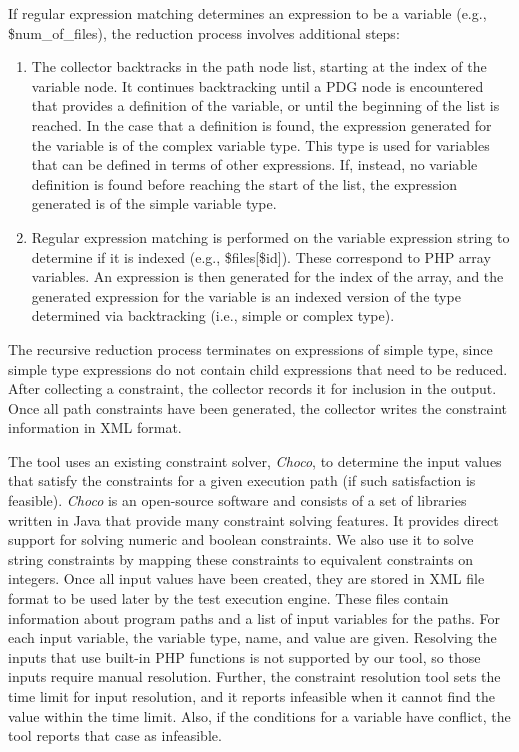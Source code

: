 If regular expression matching determines an expression
to be a variable (e.g., \$num\_of\_files), the reduction
process involves additional steps:

\begin{enumerate}
  \item The collector backtracks in the path node list,
starting at the index of the variable node. It continues
backtracking until a PDG node is encountered that provides
a definition of the variable, or until the beginning of
the list is reached. In the case that a definition is found,
the expression generated for the variable is of the complex
variable type. This type is used for variables that can be
defined in terms of other expressions. If, instead, no
variable definition is found before reaching the start of
the list, the expression generated is of the simple variable type.

  \item Regular expression matching is performed on the
variable expression string to determine if it is indexed
(e.g., \$files[\$id]). These correspond to PHP array variables.
An expression is then generated for the index of the array, and
the generated expression for the variable is an indexed version
of the type determined via backtracking (i.e., simple or complex 
type).
\end{enumerate}

The recursive reduction process terminates on expressions of
simple type, since simple type expressions do not contain
child expressions that need to be reduced.
After collecting a constraint, the collector records it for
inclusion in the output. 
Once all path constraints
have been generated, the collector writes the constraint information
in XML format. 

The tool uses an existing constraint solver, {\em Choco},
to determine the input values that satisfy the constraints
for a given execution path (if such satisfaction is feasible).
{\em Choco} is an open-source software and  consists of a set
of libraries written in Java that provide many constraint solving
features. It provides direct support for solving numeric and
boolean constraints. We also use it to solve string constraints
by mapping these constraints to equivalent constraints on integers. 
Once all input values have been created, they are stored in XML file 
format to be used later by the test execution engine.
These files contain information about program paths and a list of input 
variables for the paths. For each input variable, the variable type, 
name, and value are given. 
Resolving the inputs that use built-in PHP functions is not supported 
by our tool, so those inputs require manual resolution. 
Further, the constraint resolution tool sets the time limit for 
input resolution, and it reports infeasible when it cannot find 
the value within the time limit. Also, if the conditions for a 
variable have conflict, the tool reports that case as infeasible.

